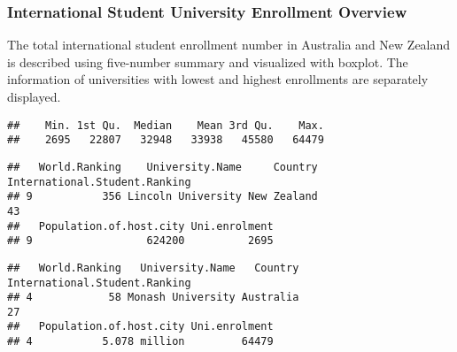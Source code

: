 \documentclass[
]{article}
\newenvironment{Shaded}{\begin{snugshade}}{\end{snugshade}}
\newcommand{\FunctionTok}[1]{\textcolor[rgb]{0.00,0.00,0.00}{#1}}
\newcommand{\NormalTok}[1]{#1}
\newcommand{\OtherTok}[1]{\textcolor[rgb]{0.56,0.35,0.01}{#1}}
\newcommand{\SpecialCharTok}[1]{\textcolor[rgb]{0.00,0.00,0.00}{#1}}
\begin{document}
\hypertarget{international-student-university-enrollment-overview}{%
\subsubsection{International Student University Enrollment
Overview}\label{international-student-university-enrollment-overview}}

The total international student enrollment number in Australia and New
Zealand is described using five-number summary and visualized with
boxplot. The information of universities with lowest and highest
enrollments are separately displayed.

\begin{Shaded}
\end{Shaded}

\begin{verbatim}
##    Min. 1st Qu.  Median    Mean 3rd Qu.    Max. 
##    2695   22807   32948   33938   45580   64479
\end{verbatim}

\begin{Shaded}
\end{Shaded}

\begin{verbatim}
##   World.Ranking    University.Name     Country International.Student.Ranking
## 9           356 Lincoln University New Zealand                            43
##   Population.of.host.city Uni.enrolment
## 9                  624200          2695
\end{verbatim}

\begin{Shaded}
\end{Shaded}

\begin{verbatim}
##   World.Ranking   University.Name   Country International.Student.Ranking
## 4            58 Monash University Australia                            27
##   Population.of.host.city Uni.enrolment
## 4           5.078 million         64479
\end{verbatim}
\end{document}
